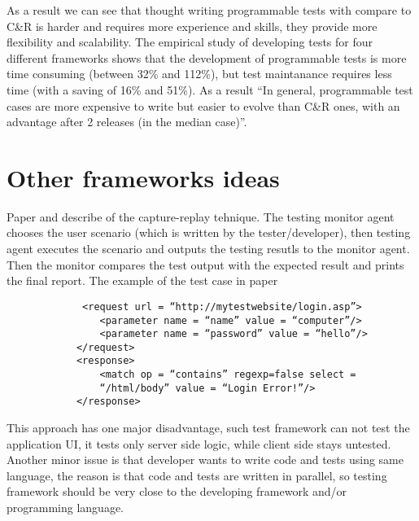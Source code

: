       As a result we can see that thought writing programmable tests with
      compare to C\&R is harder and requires more experience and skills, they
      provide more flexibility and scalability. The empirical study
       of developing tests for four different frameworks shows that the development of programmable tests is more time
      consuming (between 32\% and 112\%), but test maintanance requires less
      time (with a saving of 16\% and 51\%). As a result ``In general, programmable test cases are more
expensive to write but easier to evolve than C\&R ones, with an advantage after
2 releases (in the median case)''.\cite{CaptureReplay7}

   \section {Other frameworks ideas}
   		Paper \cite{Xu1} and \cite{Zhongen2} describe of the capture-replay
   		tehnique.
   		The testing monitor agent chooses the user scenario (which is written by the tester/developer),
   		 then testing agent executes the scenario and outputs the testing
   		 resutls to the monitor agent. Then the monitor compares the test output
   		 with the expected result and prints the final report. The example of the
   		 test case in paper \cite{Zhongen2}
   		 \begin{verbatim}
			 <request url = “http://mytestwebsite/login.asp”> 
			 	<parameter name = “name” value = “computer”/> 
			 	<parameter name = “password” value = “hello”/> 
			</request> 
			<response> 
			 	<match op = “contains” regexp=false select = 
			 	“/html/body” value = “Login Error!”/> 
			</response> 
   		 \end{verbatim}	
		This approach has one major disadvantage, such test framework can not test
		the application UI, it tests only server side logic, while client
		side stays untested. Another minor issue is that developer wants to write
		code and tests using same language, the reason is that code and tests are
		written in parallel, so testing framework should be very close to the
		developing framework and/or programming language.
		

